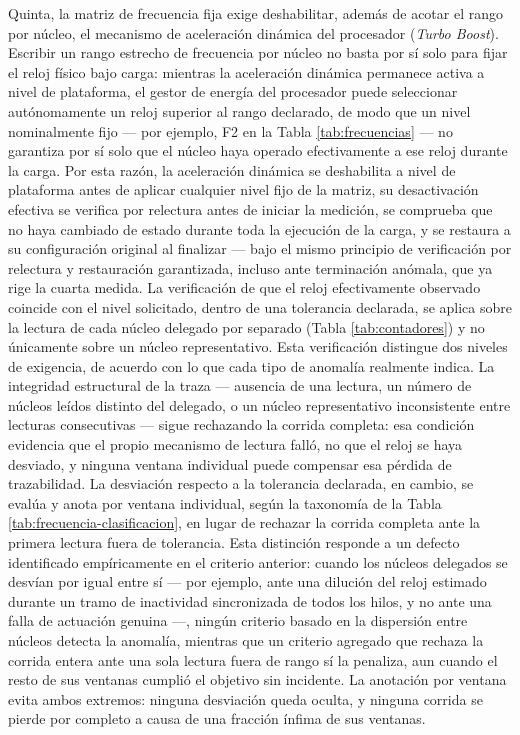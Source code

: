 \documentclass[12pt,oneside,spanish]{book}
\begin{document}
Quinta, la matriz de frecuencia fija exige deshabilitar, además de acotar el rango por núcleo, el mecanismo de aceleración dinámica del procesador (\textit{Turbo Boost}). Escribir un rango estrecho de frecuencia por núcleo no basta por sí solo para fijar el reloj físico bajo carga: mientras la aceleración dinámica permanece activa a nivel de plataforma, el gestor de energía del procesador puede seleccionar autónomamente un reloj superior al rango declarado, de modo que un nivel nominalmente fijo --- por ejemplo, F2 en la Tabla \ref{tab:frecuencias} --- no garantiza por sí solo que el núcleo haya operado efectivamente a ese reloj durante la carga. Por esta razón, la aceleración dinámica se deshabilita a nivel de plataforma antes de aplicar cualquier nivel fijo de la matriz, su desactivación efectiva se verifica por relectura antes de iniciar la medición, se comprueba que no haya cambiado de estado durante toda la ejecución de la carga, y se restaura a su configuración original al finalizar --- bajo el mismo principio de verificación por relectura y restauración garantizada, incluso ante terminación anómala, que ya rige la cuarta medida. La verificación de que el reloj efectivamente observado coincide con el nivel solicitado, dentro de una tolerancia declarada, se aplica sobre la lectura de cada núcleo delegado por separado (Tabla \ref{tab:contadores}) y no únicamente sobre un núcleo representativo. Esta verificación distingue dos niveles de exigencia, de acuerdo con lo que cada tipo de anomalía realmente indica. La integridad estructural de la traza --- ausencia de una lectura, un número de núcleos leídos distinto del delegado, o un núcleo representativo inconsistente entre lecturas consecutivas --- sigue rechazando la corrida completa: esa condición evidencia que el propio mecanismo de lectura falló, no que el reloj se haya desviado, y ninguna ventana individual puede compensar esa pérdida de trazabilidad. La desviación respecto a la tolerancia declarada, en cambio, se evalúa y anota por ventana individual, según la taxonomía de la Tabla \ref{tab:frecuencia-clasificacion}, en lugar de rechazar la corrida completa ante la primera lectura fuera de tolerancia. Esta distinción responde a un defecto identificado empíricamente en el criterio anterior: cuando los núcleos delegados se desvían por igual entre sí --- por ejemplo, ante una dilución del reloj estimado durante un tramo de inactividad sincronizada de todos los hilos, y no ante una falla de actuación genuina ---, ningún criterio basado en la dispersión entre núcleos detecta la anomalía, mientras que un criterio agregado que rechaza la corrida entera ante una sola lectura fuera de rango sí la penaliza, aun cuando el resto de sus ventanas cumplió el objetivo sin incidente. La anotación por ventana evita ambos extremos: ninguna desviación queda oculta, y ninguna corrida se pierde por completo a causa de una fracción ínfima de sus ventanas.
\end{document}
